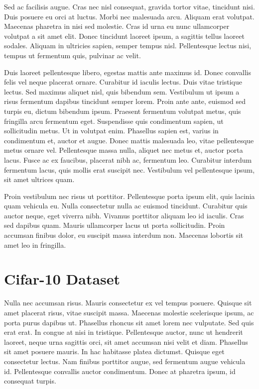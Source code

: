 Sed ac facilisis augue. Cras nec nisl consequat, gravida tortor vitae, tincidunt nisi. Duis posuere eu orci at luctus. Morbi nec malesuada arcu. Aliquam erat volutpat. Maecenas pharetra in nisi sed molestie. Cras id urna eu nunc ullamcorper volutpat a sit amet elit. Donec tincidunt laoreet ipsum, a sagittis tellus laoreet sodales. Aliquam in ultricies sapien, semper tempus nisl. Pellentesque lectus nisi, tempus ut fermentum quis, pulvinar ac velit.

Duis laoreet pellentesque libero, egestas mattis ante maximus id. Donec convallis felis vel neque placerat ornare. Curabitur id iaculis lectus. Duis vitae tristique lectus. Sed maximus aliquet nisl, quis bibendum sem. Vestibulum ut ipsum a risus fermentum dapibus tincidunt semper lorem. Proin ante ante, euismod sed turpis eu, dictum bibendum ipsum. Praesent fermentum volutpat metus, quis fringilla arcu fermentum eget. Suspendisse quis condimentum sapien, ut sollicitudin metus. Ut in volutpat enim. Phasellus sapien est, varius in condimentum et, auctor et augue. Donec mattis malesuada leo, vitae pellentesque metus ornare vel. Pellentesque massa nulla, aliquet nec metus et, auctor porta lacus. Fusce ac ex faucibus, placerat nibh ac, fermentum leo. Curabitur interdum fermentum lacus, quis mollis erat suscipit nec. Vestibulum vel pellentesque ipsum, sit amet ultrices quam.

Proin vestibulum nec risus ut porttitor. Pellentesque porta ipsum elit, quis lacinia quam vehicula eu. Nulla consectetur nulla ac euismod tincidunt. Curabitur quis auctor neque, eget viverra nibh. Vivamus porttitor aliquam leo id iaculis. Cras sed dapibus quam. Mauris ullamcorper lacus ut porta sollicitudin. Proin accumsan finibus dolor, eu suscipit massa interdum non. Maecenas lobortis sit amet leo in fringilla.

\section{Cifar-10 Dataset} %
\label{sub:amet}
Nulla nec accumsan risus. Mauris consectetur ex vel tempus posuere. Quisque sit amet placerat risus, vitae suscipit massa. Maecenas molestie scelerisque ipsum, ac porta purus dapibus ut. Phasellus rhoncus sit amet lorem nec vulputate. Sed quis erat erat. In congue at nisi in tristique. Pellentesque auctor, nunc ut hendrerit laoreet, neque urna sagittis orci, sit amet accumsan nisi velit et diam. Phasellus sit amet posuere mauris. In hac habitasse platea dictumst. Quisque eget consectetur lectus. Nam finibus porttitor augue, sed fermentum augue vehicula id. Pellentesque convallis auctor condimentum. Donec at pharetra ipsum, id consequat turpis.

